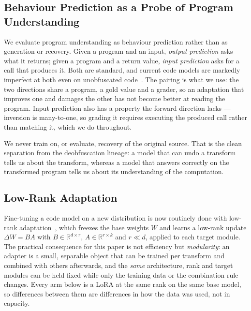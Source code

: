 \subsection{Behaviour Prediction as a Probe of Program Understanding}
We evaluate program understanding as behaviour prediction rather than as generation or recovery.
Given a program and an input, \emph{output prediction} asks what it returns; given a program and a
return value, \emph{input prediction} asks for a call that produces it. Both are standard, and
current code models are markedly imperfect at both even on unobfuscated
code~\cite{cruxeval}. The pairing is what we use: the two directions share a program, a gold value
and a grader, so an adaptation that improves one and damages the other has not become better at
reading the program. Input prediction also has a property the forward direction lacks --- inversion
is many-to-one, so grading it requires executing the produced call rather than matching it, which we
do throughout.

We never train on, or evaluate, recovery of the original source. That is the clean separation from
the deobfuscation lineage: a model that can undo a transform tells us about the transform, whereas a
model that answers correctly on the transformed program tells us about its understanding of the
computation.


\subsection{Low-Rank Adaptation}
Fine-tuning a code model on a new distribution is now routinely done with low-rank
adaptation~\cite{lora}, which freezes the base weights $W$ and learns a low-rank update $\Delta W =
BA$ with $B \in \mathbb{R}^{d \times r}$, $A \in \mathbb{R}^{r \times k}$ and $r \ll d$, applied to
each target module. The practical consequence for this paper is not efficiency but
\emph{modularity}: an adapter is a small, separable object that can be trained per transform and
combined with others afterwards, and the \emph{same} architecture, rank and target modules can be
held fixed while only the training data or the combination rule changes. Every arm below is a LoRA
at the same rank on the same base model, so differences between them are differences in how the data
was used, not in capacity.

